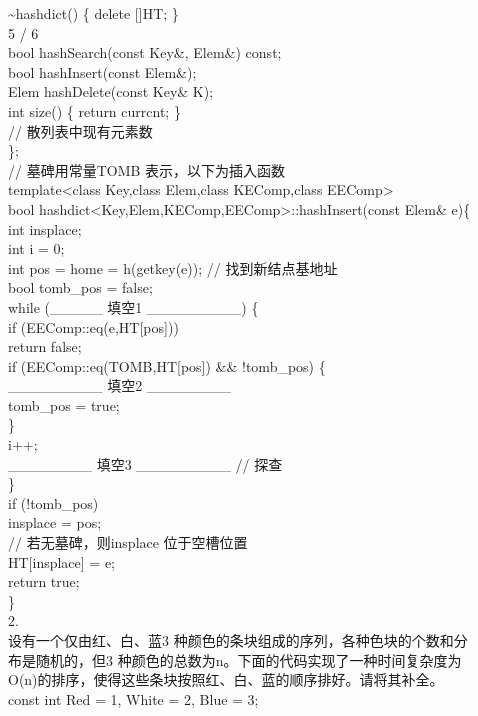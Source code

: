 \begin{question}
\textasciitilde{}hashdict() \{ delete []HT; \}\\
5 / 6\\
bool hashSearch(const Key\&, Elem\&) const;\\
bool hashInsert(const Elem\&);\\
Elem hashDelete(const Key\& K);\\
int size() \{ return currcnt; \}\\
// 散列表中现有元素数\\
\};\\
// 墓碑用常量TOMB 表示，以下为插入函数\\
template<class Key,class Elem,class KEComp,class EEComp>\\
bool hashdict<Key,Elem,KEComp,EEComp>::hashInsert(const Elem\& e)\{\\
int insplace;\\
int i = 0;\\
int pos  = home = h(getkey(e));   // 找到新结点基地址\\
bool tomb\_pos = false;\\
while (\_\_\_\_\_ 填空1 \_\_\_\_\_\_\_\_\_)  \{\\
if (EEComp::eq(e,HT[pos]))\\
return false;\\
if (EEComp::eq(TOMB,HT[pos]) \&\& !tomb\_pos) \{\\
\_\_\_\_\_\_\_\_\_ 填空2 \_\_\_\_\_\_\_\_\\
tomb\_pos = true;\\
\}\\
i++;\\
\_\_\_\_\_\_\_\_ 填空3 \_\_\_\_\_\_\_\_\_  // 探查\\
\}\\
if (!tomb\_pos)\\
insplace = pos;\\
// 若无墓碑，则insplace 位于空槽位置\\
HT[insplace] = e;\\
return true;\\
\}\\
2.\\
设有一个仅由红、白、蓝3 种颜色的条块组成的序列，各种色块的个数和分\\
布是随机的，但3 种颜色的总数为n。下面的代码实现了一种时间复杂度为\\
O(n)的排序，使得这些条块按照红、白、蓝的顺序排好。请将其补全。\\
const int Red = 1, White = 2, Blue = 3;\\

\end{question}
